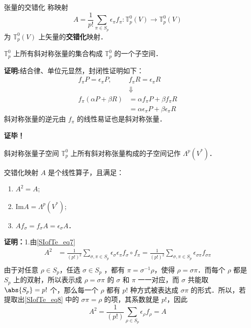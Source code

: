 \begin{definition}{张量的交错化}
称映射
\begin{equation}\label{SIofTe_eq7}
A=\frac{1}{p!}\sum_{\pi\in S_p}\epsilon_\pi f_\pi:\mathbb{T}_p^0(V)\rightarrow\mathbb{T}_p^0(V)
\end{equation}
为 $\mathbb{T}_p^0(V)$ 上矢量的\textbf{交错化}映射．
\end{definition}
\begin{theorem}{}
$\mathbb{T}_p^0$ 上所有斜对称张量的集合构成 $\mathbb{T}_p^0$ 的一个子空间．
\end{theorem}
\textbf{证明:}结合律、单位元显然，封闭性证明如下：
\begin{equation}
\begin{aligned}
f_\pi P=\epsilon_\pi P,\quad&f_\pi R=\epsilon_\pi R\\
&\Downarrow\\
f_\pi(\alpha P+\beta R)&=\alpha f_\pi P+\beta f_\pi R\\
&=\alpha \epsilon_\pi P+\beta \epsilon_\pi R
\end{aligned}
\end{equation}
斜对称张量的逆元由 $f_\pi$ 的线性易证也是斜对称张量．

\textbf{证毕！}
\begin{definition}{斜对称张量子空间}
$\mathbb{T}_p^0$ 上所有斜对称张量构成的子空间记作 $\Lambda^p(V^*)$．
\end{definition}
\begin{theorem}{}\label{SIofTe_the1}
交错化映射 $A$ 是个线性算子，且满足：
\begin{enumerate}
\item $A^2=A$;
\item $\mathrm{Im} A=\Lambda^p(V^*)$;
\item $Af_\sigma=f_\sigma A=\epsilon_\sigma A$．
\end{enumerate}
\end{theorem}
\textbf{证明：}1.由\autoref{SIofTe_eq7} 
\begin{equation}\label{SIofTe_eq8}
\begin{aligned}
A^2&=\frac{1}{(p!)^2}\sum_{\sigma,\pi\in S_p}\epsilon_\sigma\epsilon_\pi f_\sigma\circ f_\pi=\frac{1}{(p!)^2}\sum_{\sigma,\pi\in S_p}\epsilon_{\sigma\pi} f_{\sigma\pi}\\
\end{aligned}
\end{equation}
由于对任意 $\rho\in S_p$，任选 $\sigma\in S_p$ ，都有 $\pi=\sigma^{-1}\rho$，使得 $\rho=\sigma\pi$．而每个 $\rho$ 都是 $S_p$ 上的双射，所以表示成 $\rho=\sigma\pi$ 的 $\sigma$ 和 $\pi$ 一一对应，而 $\sigma$ 共能取 $\abs{S_p}=p!$ 个，那么每一个 $\rho$ 都有 $p!$ 种方式被表达成 $\sigma \pi$ 的形式．所以，若提取出\autoref{SIofTe_eq8} 中的 $\sigma\pi=\rho$ 的项，其系数就是 $p!$，因此
\begin{equation}
A^2=\frac{1}{(p!)}\sum_{\rho\in S_p}\epsilon_\rho f_\rho=A
\end{equation}

